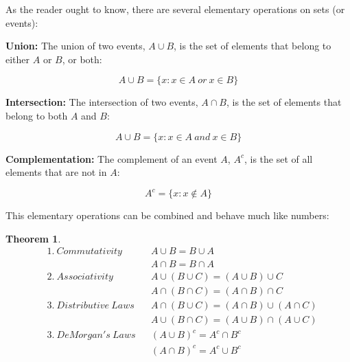 \documentclass[
  oneside,
  11pt, a4paper,
  footinclude=true,
  headinclude=true,
  cleardoublepage=empty
]{scrbook}
\theoremstyle{definition}
\theoremstyle{definition}
\newtheorem{theorem}{Theorem}[section]
\begin{document}
            As the reader ought to know, there are several elementary operations on sets (or events):
            
            \vskip0.2cm
            \textbf{Union:} The union of two events, $A \cup B$, is the set of elements that belong to either $A$ or $B$, or both:
            
            \begin{equation}
                A \cup B = \{x : x \in A\ or\ x \in B\}
            \end{equation}{}
            
            \textbf{Intersection:} The intersection of two events, $A \cap B$, is the set of elements that belong to both $A$ and $B$:
            
            \begin{equation}
                A \cup B = \{x : x \in A\ and\ x \in B\}
            \end{equation}{}
            
            \textbf{Complementation:} The complement of an event $A$, $A^c$, is the set of all elements that are not in $A$:
            
            \begin{equation}
                A^c = \{x : x \notin A \}
            \end{equation}{}
            
            This elementary operations can be combined and behave much like numbers:
            
            \begin{theorem}{}
            \begin{align*}
                &1.\ Commutativity && A \cup B = B \cup A \\
                &                  && A \cap B = B \cap A \\
                &2.\ Associativity && A \cup (B \cup C) = (A \cup B) \cup C \\
                &                  && A \cap (B \cap C) = (A \cap B) \cap C \\
                &3.\ Distributive\ Laws && A \cap (B \cup C) = (A \cap B) \cup (A \cap C) \\
                &                       && A \cup (B \cap C) = (A \cup B) \cap (A \cup C) \\
                &3.\ DeMorgan's\ Laws && (A \cup B)^c = A^c \cap B^c \\
                &                     && (A \cap B)^c = A^c \cup B^c
            \end{align*}{}
            \end{theorem}
            
\end{document}
